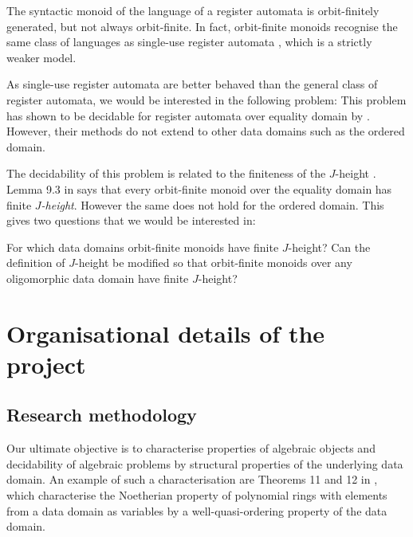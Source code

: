 \documentclass[a4paper,11pt]{article}
\begin{document}
The syntactic monoid of the language of a register automata is orbit-finitely generated,
but not always orbit-finite.
In fact, orbit-finite monoids recognise the same class of languages as single-use register automata \cite[Theorem 6]{BS20},
which is a strictly weaker model.

As single-use register automata are better behaved than the general class of register automata,
we would be interested in the following problem:
%
%
This problem has shown to be decidable for register automata over equality domain by \cite{ofMon}.
However, their methods do not extend to other data domains such as the ordered domain.

The decidability of this problem is related to the finiteness of the $J$-height  \cite[Page 5]{Colcombet11}.
Lemma 9.3 in \cite{nomMon} says that every orbit-finite monoid over the equality domain has finite \emph{$J$-height}.
However the same does not hold for the ordered domain.
This gives two questions that we would be interested in:
\begin{question}
For which data domains orbit-finite monoids have finite $J$-height?
Can the definition of $J$-height be modified so that orbit-finite monoids over any oligomorphic data domain have finite $J$-height?
\end{question}
\section{Organisational details of the project}
%
\subsection{Research methodology}
%
Our ultimate objective is to characterise properties of algebraic objects and decidability of algebraic problems by structural properties of the underlying data domain.
An example of such a characterisation are Theorems 11 and 12 in ,
which characterise the Noetherian property of polynomial rings with elements from a data domain as variables by a well-quasi-ordering property of the data domain.
\end{document}
